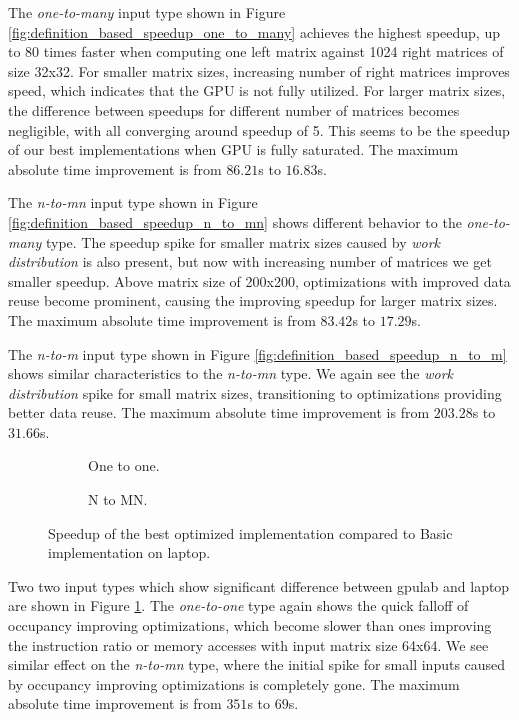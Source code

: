 The \textit{one-to-many} input type shown in Figure \ref{fig:definition_based_speedup_one_to_many} achieves the highest speedup, up to 80 times faster when computing one left matrix against 1024 right matrices of size 32x32. For smaller matrix sizes, increasing number of right matrices improves speed, which indicates that the GPU is not fully utilized. For larger matrix sizes, the difference between speedups for different number of matrices becomes negligible, with all converging around speedup of 5. This seems to be the speedup of our best implementations when GPU is fully saturated. The maximum absolute time improvement is from $86.21$s to $16.83$s. 

The \textit{n-to-mn} input type shown in Figure \ref{fig:definition_based_speedup_n_to_mn} shows different behavior to the \textit{one-to-many} type. The speedup spike for smaller matrix sizes caused by \textit{work distribution} is also present, but now with increasing number of matrices we get smaller speedup. Above matrix size of 200x200, optimizations with improved data reuse become prominent, causing the improving speedup for larger matrix sizes. The maximum absolute time improvement is from $83.42$s to $17.29$s. 

The \textit{n-to-m} input type shown in Figure \ref{fig:definition_based_speedup_n_to_m} shows similar characteristics to the \textit{n-to-mn} type. We again see the \textit{work distribution} spike for small matrix sizes, transitioning to optimizations providing better data reuse. The maximum absolute time improvement is from $203.28$s to $31.66$s.

\begin{figure}[ht]
	\centering	
	\begin{subfigure}{0.4\textwidth}
		\centering
		\def\svgwidth{\textwidth}
		
		\caption{One to one.}
	\end{subfigure}
	\begin{subfigure}{0.4\textwidth}
		\centering
		\def\svgwidth{\textwidth}
		
		\caption{N to MN.}
	\end{subfigure}
	\caption{Speedup of the best optimized implementation compared to Basic implementation on laptop.}
	\label{fig:definition_based_speedup_laptop}
\end{figure}

Two two input types which show significant difference between gpulab and laptop are shown in Figure \ref{fig:definition_based_speedup_laptop}. The \textit{one-to-one} type again shows the quick falloff of occupancy improving optimizations, which become slower than ones improving the instruction ratio or memory accesses with input matrix size 64x64. We see similar effect on the \textit{n-to-mn} type, where the initial spike for small inputs caused by occupancy improving optimizations is completely gone. The maximum absolute time improvement is from $351$s to $69$s.

